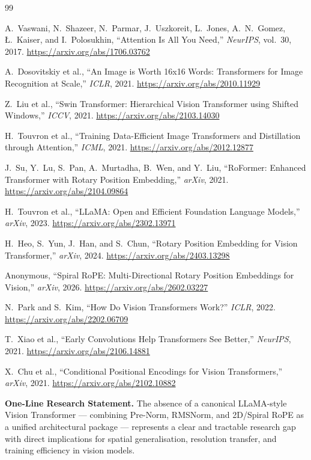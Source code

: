 \documentclass[12pt,a4paper]{article}
\begin{document}
\begin{thebibliography}{99}

A.~Vaswani, N.~Shazeer, N.~Parmar, J.~Uszkoreit, L.~Jones, A.~N.~Gomez,
\L.~Kaiser, and I.~Polosukhin,
``Attention Is All You Need,''
\emph{NeurIPS}, vol.~30, 2017.
\url{https://arxiv.org/abs/1706.03762}

A.~Dosovitskiy et al.,
``An Image is Worth 16x16 Words: Transformers for Image Recognition at Scale,''
\emph{ICLR}, 2021.
\url{https://arxiv.org/abs/2010.11929}

Z.~Liu et al.,
``Swin Transformer: Hierarchical Vision Transformer using Shifted Windows,''
\emph{ICCV}, 2021.
\url{https://arxiv.org/abs/2103.14030}

H.~Touvron et al.,
``Training Data-Efficient Image Transformers and Distillation through Attention,''
\emph{ICML}, 2021.
\url{https://arxiv.org/abs/2012.12877}

J.~Su, Y.~Lu, S.~Pan, A.~Murtadha, B.~Wen, and Y.~Liu,
``RoFormer: Enhanced Transformer with Rotary Position Embedding,''
\emph{arXiv}, 2021.
\url{https://arxiv.org/abs/2104.09864}

H.~Touvron et al.,
``LLaMA: Open and Efficient Foundation Language Models,''
\emph{arXiv}, 2023.
\url{https://arxiv.org/abs/2302.13971}

H.~Heo, S.~Yun, J.~Han, and S.~Chun,
``Rotary Position Embedding for Vision Transformer,''
\emph{arXiv}, 2024.
\url{https://arxiv.org/abs/2403.13298}

Anonymous,
``Spiral RoPE: Multi-Directional Rotary Position Embeddings for Vision,''
\emph{arXiv}, 2026.
\url{https://arxiv.org/abs/2602.03227}

N.~Park and S.~Kim,
``How Do Vision Transformers Work?''
\emph{ICLR}, 2022.
\url{https://arxiv.org/abs/2202.06709}

T.~Xiao et al.,
``Early Convolutions Help Transformers See Better,''
\emph{NeurIPS}, 2021.
\url{https://arxiv.org/abs/2106.14881}

X.~Chu et al.,
``Conditional Positional Encodings for Vision Transformers,''
\emph{arXiv}, 2021.
\url{https://arxiv.org/abs/2102.10882}

\end{thebibliography}

\vspace{1em}
\begin{callout}
  \textbf{One-Line Research Statement.} The absence of a canonical LLaMA-style
  Vision Transformer --- combining Pre-Norm, RMSNorm, and 2D/Spiral RoPE as a
  unified architectural package --- represents a clear and tractable research
  gap with direct implications for spatial generalisation, resolution transfer,
  and training efficiency in vision models.
\end{callout}
\end{document}
